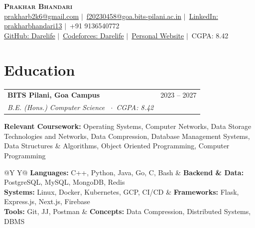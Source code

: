 \documentclass[10pt,letterpaper]{article}
\makeatletter
\newcommand{\resumeSubheading}[4]{
  \vspace{1.5pt}
  \noindent
  \begin{tabularx}{\linewidth}{@{}X r@{}}
    \textbf{#1} & #2 \\
    \textit{\small#3} & \textit{\small#4} \\
  \end{tabularx}\vspace{-1.5pt}
}
\makeatother
\begin{document}
\begin{center}
    {\Huge \textbf{\scshape Prakhar Bhandari}} \\[5pt]
    \small \href{mailto:prakharb2k6@gmail.com}{prakharb2k6@gmail.com} $\vert$\ \href{mailto:f20230458@goa.bits-pilani.ac.in}{f20230458@goa.bits-pilani.ac.in} $\vert$\ \href{https://www.linkedin.com/in/prakharbhandari13}{LinkedIn: prakharbhandari13} $\vert$\ +91 9136540772 \\[4pt]
    \small 
    \href{https://github.com/darelife}{GitHub: Darelife} $\vert$\ 
    \href{https://codeforces.com/profile/darelife}{Codeforces: Darelife} $\vert$\ \href{https://www.darelife.xyz/}{Personal Website} $\vert$\ CGPA: 8.42
\end{center}

\section*{Education}
\resumeSubheading
    {BITS Pilani, Goa Campus}{2023 -- 2027}
    {B.E. (Hons.) Computer Science \ $\cdot$\ CGPA: 8.42}{}

\vspace{4pt}
\small{\textbf{Relevant Coursework:} Operating Systems, Computer Networks, Data Storage Technologies and Networks, Data Compression, Database Management Systems, Data Structures \& Algorithms, Object Oriented Programming, Computer Programming}


\vspace{4pt}
{\small
\begin{tabularx}{\linewidth}{@{}Y Y@{}}
    \textbf{Languages:} C++, Python, Java, Go, C, Bash &
    \textbf{Backend \& Data:} PostgreSQL, MySQL, MongoDB, Redis \\
    \textbf{Systems:} Linux, Docker, Kubernetes, GCP, CI/CD &
    \textbf{Frameworks:} Flask, Express.js, Next.js, Firebase \\
    \textbf{Tools:} Git, JJ, Postman &
    \textbf{Concepts:} Data Compression, Distributed Systems, DBMS
\end{tabularx}}

\end{document}
